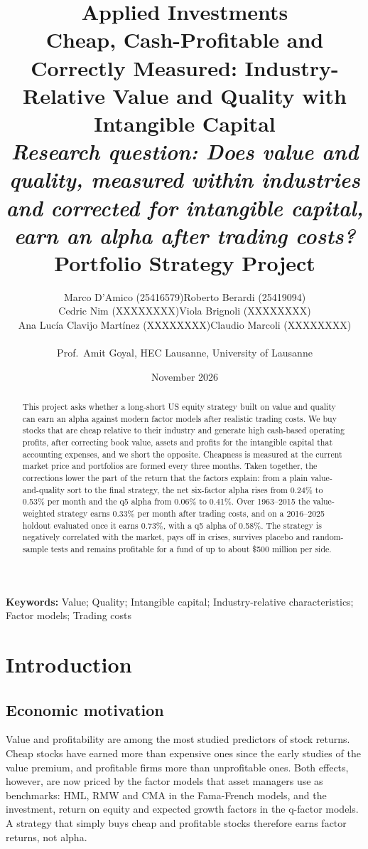 \documentclass[12pt,a4paper]{article}
\title{%
    \Large \textbf{Applied Investments} \\
    \vspace{0.5cm}
    \LARGE \textbf{Cheap, Cash-Profitable and Correctly Measured: Industry-Relative Value and Quality with Intangible Capital} \\
    \vspace{0.3cm}
    \large \textit{Research question: Does value and quality, measured within industries and corrected for intangible capital, earn an alpha after trading costs?} \\
    \vspace{0.3cm}
    \large Portfolio Strategy Project
}
\author{%
    \normalsize\begin{tabular}{cc}
    Marco D'Amico (25416579) & Roberto Berardi (25419094) \\
    Cedric Nim (XXXXXXXX) & Viola Brignoli (XXXXXXXX) \\
    Ana Luc\'ia Clavijo Mart\'inez (XXXXXXXX) & Claudio Marcoli (XXXXXXXX) \\
    \end{tabular}\\[10pt]
    \small Prof.\ Amit Goyal, HEC Lausanne, University of Lausanne
}
\date{November 2026}
\begin{document}
\maketitle
\thispagestyle{empty}

\newpage
\thispagestyle{empty}
\begin{abstract}
\noindent
This project asks whether a long-short US equity strategy built on value and quality can earn an
alpha against modern factor models after realistic trading costs. We buy stocks that are cheap
relative to their industry and generate high cash-based operating profits, after correcting book
value, assets and profits for the intangible capital that accounting expenses, and we short the
opposite. Cheapness is measured at the current market price and portfolios are formed every three
months. Taken together, the corrections lower the part of the return that the factors explain: from a plain
value-and-quality sort to the final strategy, the net six-factor alpha rises from 0.24\% to 0.53\%
per month and the q5 alpha from 0.06\% to 0.41\%. Over 1963--2015 the value-weighted strategy earns
0.33\% per month after trading costs, and on a 2016--2025 holdout evaluated once it earns 0.73\%,
with a q5 alpha of 0.58\%. The strategy is negatively correlated with the market, pays off in
crises, survives placebo and random-sample tests and remains profitable for a fund of up to about
\$500 million per side.
\end{abstract}

\vspace{0.5cm}
\noindent\textbf{Keywords:} Value; Quality; Intangible capital; Industry-relative characteristics; Factor models; Trading costs

\newpage
\begin{singlespace}
\tableofcontents
\end{singlespace}
\thispagestyle{empty}

\newpage
{}

\section{Introduction}\label{sec:intro}

\subsection{Economic motivation}

Value and profitability are among the most studied predictors of stock returns. Cheap stocks have
earned more than expensive ones since the early studies of the value premium, and profitable firms
more than unprofitable ones. Both effects, however, are now priced by the factor models that asset
managers use as benchmarks: HML, RMW and CMA in the Fama-French models, and the investment, return
on equity and expected growth factors in the q-factor models. A strategy that simply buys cheap and
profitable stocks therefore earns factor returns, not alpha.
\end{document}
